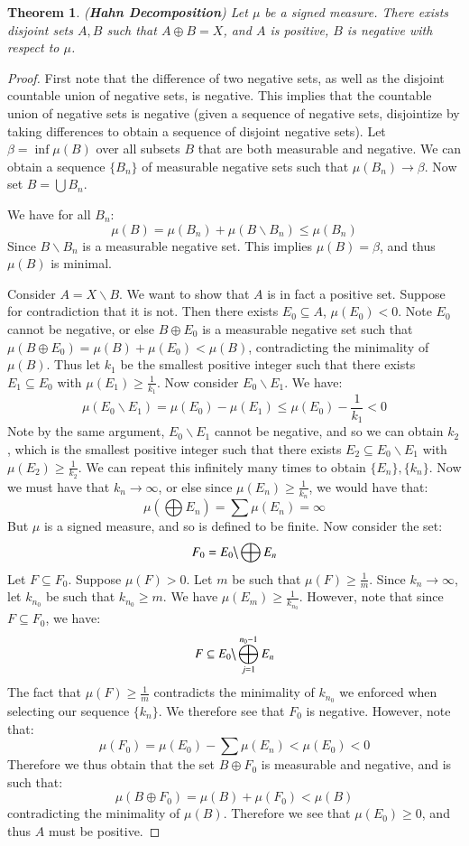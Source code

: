 \documentclass[a4paper,12pt]{report}
\newcommand{\sse} {\subseteq}
\newcommand{\bs} {\backslash}
\newtheorem{theorem}{Theorem}[section]
\begin{document}
	\begin{theorem}
	\emph{(\textbf{Hahn Decomposition})}
	Let $\mu$ be a signed measure. There exists disjoint sets $A, B$ such that $A \oplus B = X$, and $A$ is positive, $B$ is negative with respect to $\mu$.
	\end{theorem}
	\begin{proof}
	First note that the difference of two negative sets, as well as the disjoint countable union of negative sets, is negative. This implies that the countable union of negative sets is negative (given a sequence of negative sets, disjointize by taking differences to obtain a sequence of disjoint negative sets). Let $\beta = \inf \mu(B)$ over all subsets $B$ that are both measurable and negative. We can obtain a sequence $\{B_n\}$ of measurable negative sets such that $\mu(B_n) \rightarrow \beta$. Now set $B = \bigcup B_n$. 
	
	We have for all $B_n$:
	\[ \mu(B) = \mu(B_n) + \mu(B \bs B_n) \leq \mu(B_n) \]
	Since $B \bs B_n$ is a measurable negative set. This implies $\mu(B) = \beta$, and thus $\mu(B)$ is minimal.
	
	Consider $A = X \bs B$. We want to show that $A$ is in fact a positive set. Suppose for contradiction that it is not. Then there exists $E_0 \sse A$, $\mu(E_0) < 0$. Note $E_0$ cannot be negative, or else $B \oplus E_0$ is a measurable negative set such that $\mu(B \oplus E_0) = \mu(B) + \mu(E_0) < \mu(B)$, contradicting the minimality of $\mu(B)$. Thus let $k_1$ be the smallest positive integer such that there exists $E_1 \sse E_0$ with $\mu(E_1) \geq \frac{1}{k_1}$. Now consider $E_0 \bs E_1$. We have:
	\[ \mu(E_0 \bs E_1) = \mu(E_0) - \mu(E_1) \leq \mu(E_0) - \frac{1}{k_1} < 0 \]
	Note by the same argument, $E_0 \bs E_1$ cannot be negative, and so we can obtain $k_2$, which is the smallest positive integer such that there exists $E_2 \sse E_0 \bs E_1$ with $\mu(E_2) \geq \frac{1}{k_2}$. We can repeat this infinitely many times to obtain $\{E_n\}, \{k_n\}$. Now we must have that $k_n \rightarrow \infty$, or else since $\mu(E_n) \geq \frac{1}{k_n}$, we would have that:
	\[ \mu \left( \bigoplus E_n \right) = \sum \mu(E_n) = \infty \]
	But $\mu$ is a signed measure, and so is defined to be finite. Now consider the set:
	\[ F_0 = E_0 \big\bs \bigoplus E_n \]
	Let $F \sse F_0$. Suppose $\mu(F) > 0$. Let $m$ be such that $\mu(F) \geq \frac{1}{m}$. Since $k_n \rightarrow \infty$, let $k_{n_0}$ be such that $k_{n_0} \geq m$. We have $\mu(E_m) \geq \frac{1}{k_{n_0}}$. However, note that since $F \sse F_0$, we have:
	\[ F \sse E_0 \big\bs \bigoplus_{j=1}^{n_0 - 1} E_n \]
	The fact that $\mu(F) \geq \frac{1}{m}$ contradicts the minimality of $k_{n_0}$ we enforced when selecting our sequence $\{k_n\}$. We therefore see that $F_0$ is negative. However, note that:
	\[ \mu(F_0) = \mu(E_0) - \sum \mu(E_n) < \mu(E_0) < 0 \]
	Therefore we thus obtain that the set $B \oplus F_0$ is measurable and negative, and is such that:
	\[ \mu(B \oplus F_0) = \mu(B) + \mu(F_0) < \mu(B) \]
	contradicting the minimality of $\mu(B)$. Therefore we see that $\mu(E_0) \geq 0$, and thus $A$ must be positive.
	\end{proof}
	
\end{document}
